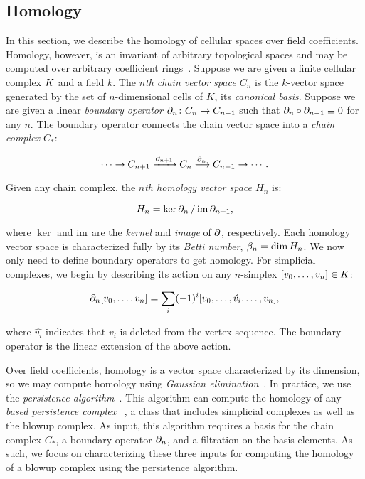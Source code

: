 \documentclass{jocg}
\begin{document}
\subsection{Homology}
In this section, we describe the homology of cellular spaces over 
field coefficients. Homology, however, is an invariant of arbitrary topological 
spaces and may be computed over arbitrary coefficient rings~\cite{hatcher}.  
Suppose we are given a finite cellular complex $K$ and a field $k$. 
The \emph{$n$th chain vector space $C_n$} is the $k$-vector space generated by 
the set of $n$-dimensional cells of $K$, its \emph{canonical basis}.  
Suppose we are given a linear \emph{boundary operator} 
$\partial_n\colon C_n \rightarrow C_{n-1}$ such that 
$\partial_n \circ \partial_{n-1} \equiv 0$ for any $n$.  
The boundary operator connects the chain vector space into a 
\emph{chain complex $C_*$}:
\begin{linenomath*}
\begin{equation*}
  \cdots \rightarrow             C_{n+1}
         \xrightarrow{\partial_{n+1}}  C_n
         \xrightarrow{\partial_n}     C_{n-1}
         \rightarrow \cdots .
\label{eqn:chaincomplex}
\end{equation*}
\end{linenomath*}
Given any chain complex, the \emph{$n$th homology vector space $H_n$} is:
\begin{linenomath*}
\begin{equation}
  \label{eqn:homology}
  H_n = {\ker{\ensuremath{\partial}_n}}\,/\,{\operatorname{im}{\partial_{n+1}}}, 
\end{equation}
\end{linenomath*}
where $\ker$ and $\operatorname{im}$ are the \emph{kernel} and \emph{image} of $\partial$, 
respectively.
Each homology vector space is characterized fully by its \emph{Betti number}, 
$\beta_n = \dim{H_n}$.  
We now only need to define boundary operators to get homology. 
For simplicial complexes, we begin by describing its action on any
$n$-simplex $[v_0,\ldots,v_n] \in K$:
\begin{linenomath*}
\begin{equation*}
\partial_n [v_0,\ldots,v_n] = \sum_i (-1)^i [v_0,\ldots,\hat{v_i},\ldots,v_n],
\end{equation*}
\end{linenomath*}
where $\hat{v_i}$ indicates that $v_i$ is deleted from the vertex 
sequence. The boundary operator is the linear extension of the above action.

Over field coefficients, homology is a vector space characterized by its dimension, 
so we may compute homology using \emph{Gaussian elimination}~\cite{uhlig}.  
In practice, we use the 
\emph{persistence algorithm}~\cite{elz-tps-02,zc-cph-05}.
This algorithm can compute the homology of any \emph{based persistence complex}
~\cite{zc-lh-08},
a class that includes simplicial complexes as well as the 
blowup complex. As input, this algorithm requires a basis for 
the chain complex $C_*$, a boundary operator $\partial_n$, and a filtration 
on the basis elements. As such, we focus on characterizing these three inputs 
for computing the homology of a blowup complex using the persistence algorithm.
\end{document}
